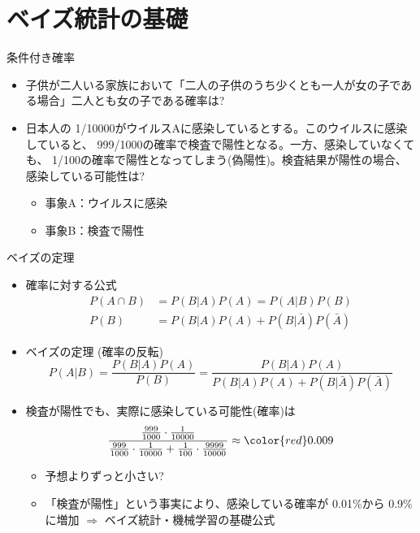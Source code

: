 \section{ベイズ統計の基礎}

\begin{frame}[t,fragile]{条件付き確率}
  \begin{itemize}
    \setlength{\itemsep}{1em}
  \item 子供が二人いる家族において「二人の子供のうち少くとも一人が女の子である場合」二人とも女の子である確率は?
  \item 日本人の{\color{red} 1/10000}がウイルスAに感染しているとする。このウイルスに感染していると、{\color{red} 999/1000}の確率で検査で陽性となる。一方、感染していなくても、{\color{red} 1/100}の確率で陽性となってしまう(偽陽性)。検査結果が陽性の場合、感染している可能性は?
    \begin{itemize}
    \item 事象A：ウイルスに感染
    \item 事象B：検査で陽性
    \end{itemize}
  \end{itemize}
\end{frame}

\begin{frame}[t,fragile]{ベイズの定理}
  \begin{itemize}
  \item 確率に対する公式
    \begin{align*}
      P(A \cap B) &= P(B|A) P(A) = P(A|B) P(B) \\ P(B) &= P(B|A) P(A) + P(B|\bar{A}) P(\bar{A})
    \end{align*}
  \item ベイズの定理 (確率の反転)
    \[
    P(A|B) = \frac{P(B|A)P(A)}{P(B)} = \frac{P(B|A)P(A)}{P(B|A) P(A) + P(B|\bar{A}) P(\bar{A})}
    \]
  \item 検査が陽性でも、実際に感染している可能性(確率)は
    \[
    \frac{\frac{999}{1000} \cdot \frac{1}{10000}}{\frac{999}{1000} \cdot \frac{1}{10000} + \frac{1}{100} \cdot \frac{9999}{10000}} \approx {\color{red} 0.009}
    \]
    \begin{itemize}
    \item 予想よりずっと小さい?
    \item 「検査が陽性」という事実により、感染している確率が 0.01\%から 0.9\%に増加 $\Rightarrow$ ベイズ統計・機械学習の基礎公式
    \end{itemize}
  \end{itemize}
\end{frame}

